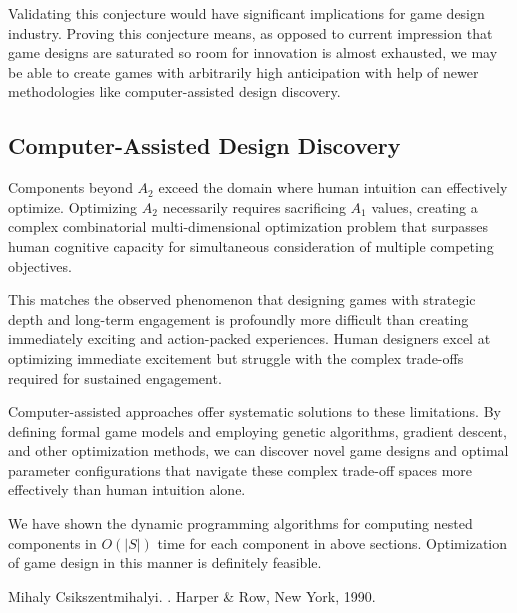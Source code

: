 \documentclass{article}
\begin{document}
Validating this conjecture would have significant implications for game design industry.
Proving this conjecture means, as opposed to current impression that game designs are saturated so room for innovation is almost exhausted, we may be able to create games with arbitrarily high anticipation with help of newer methodologies like computer-assisted design discovery.

\subsection{Computer-Assisted Design Discovery}

Components beyond $A_2$ exceed the domain where human intuition can effectively optimize. Optimizing $A_2$ necessarily requires sacrificing $A_1$ values, creating a complex combinatorial multi-dimensional optimization problem that surpasses human cognitive capacity for simultaneous consideration of multiple competing objectives.

This matches the observed phenomenon that designing games with strategic depth and long-term engagement is profoundly more difficult than creating immediately exciting and action-packed experiences. Human designers excel at optimizing immediate excitement but struggle with the complex trade-offs required for sustained engagement.

Computer-assisted approaches offer systematic solutions to these limitations. By defining formal game models and employing genetic algorithms, gradient descent, and other optimization methods, we can discover novel game designs and optimal parameter configurations that navigate these complex trade-off spaces more effectively than human intuition alone.

We have shown the dynamic programming algorithms for computing nested components in $O(|S|)$ time for each component in above sections. Optimization of game design in this manner is definitely feasible.




\begin{thebibliography}{1}

Mihaly Csikszentmihalyi.
.
\newblock Harper \& Row, New York, 1990.

\end{thebibliography}
\end{document}
